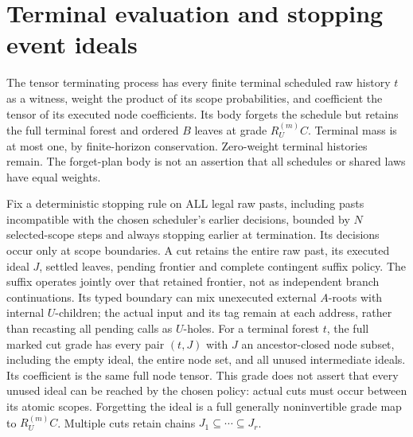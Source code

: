 \documentclass[11pt]{article}
\begin{document}
\section{Terminal evaluation and stopping event ideals}
The tensor terminating process has every finite terminal scheduled raw history $t$ as a witness, weight the product of its scope probabilities, and coefficient the tensor of its executed node coefficients. Its body forgets the schedule but retains the full terminal forest and ordered $B$ leaves at grade $R_U^{(m)}C$. Terminal mass is at most one, by finite-horizon conservation. Zero-weight terminal histories remain. The forget-plan body is not an assertion that all schedules or shared laws have equal weights.

Fix a deterministic stopping rule on ALL legal raw pasts, including pasts incompatible with the chosen scheduler's earlier decisions, bounded by $N$ selected-scope steps and always stopping earlier at termination. Its decisions occur only at scope boundaries. A cut retains the entire raw past, its executed ideal $J$, settled leaves, pending frontier and complete contingent suffix policy. The suffix operates jointly over that retained frontier, not as independent branch continuations. Its typed boundary can mix unexecuted external $A$-roots with internal $U$-children; the actual input and its tag remain at each address, rather than recasting all pending calls as $U$-holes. For a terminal forest $t$, the full marked cut grade has every pair $(t,J)$ with $J$ an ancestor-closed node subset, including the empty ideal, the entire node set, and all unused intermediate ideals. Its coefficient is the same full node tensor. This grade does not assert that every unused ideal can be reached by the chosen policy: actual cuts must occur between its atomic scopes. Forgetting the ideal is a full generally noninvertible grade map to $R_U^{(m)}C$. Multiple cuts retain chains $J_1\subseteq\cdots\subseteq J_r$.
\end{document}
